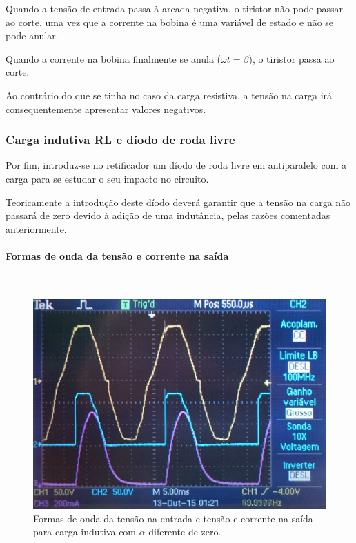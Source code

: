 \documentclass[a4paper,11pt]{article}
\numberwithin{equation}{section}
\begin{document}
Quando a tensão de entrada passa à arcada negativa, o tiristor não pode passar ao corte, uma vez que a corrente na bobina é uma variável de estado e não se pode anular.

Quando a corrente na bobina finalmente se anula ($\omega t = \beta$), o tiristor passa ao corte.

Ao contrário do que se tinha no caso da carga resistiva, a tensão na carga irá consequentemente apresentar valores negativos.


\subsubsection{Carga indutiva RL e díodo de roda livre}

Por fim, introduz-se no retificador um díodo de roda livre em antiparalelo com a carga para se estudar o seu impacto no circuito.

Teoricamente a introdução deste díodo deverá garantir que a tensão na carga não passará de zero devido à adição de uma indutância, pelas razões comentadas anteriormente.


\paragraph{Formas de onda da tensão e corrente na saída \label{parag:1}}\mbox{}\

\begin{figure}[h]
	\centering
	\includegraphics[keepaspectratio=true, scale=0.11]{img/figs/bobine_alfa_dif_zero}
	\caption{Formas de onda da tensão na entrada e tensão e corrente na saída para carga indutiva com $\alpha$ diferente de zero.}
	\label{fig:bobine_alfa_dif_zero}
	\vspace{-0.8em}
\end{figure}
\end{document}
